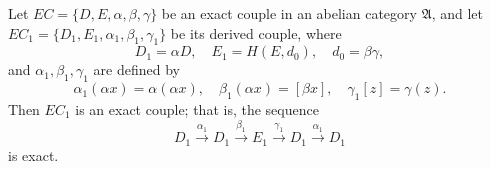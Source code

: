 Let $\mathit{EC} = \{D, E, \alpha, \beta, \gamma\}$ be an exact couple in an abelian category $\mathfrak{A}$, and let $\mathit{EC}_1 = \{D_1, E_1, \alpha_1, \beta_1, \gamma_1\}$ be its derived couple, where
$$D_1 = \alpha D, \quad E_1 = H(E, d_0), \quad d_0 = \beta\gamma,$$
and $\alpha_1, \beta_1, \gamma_1$ are defined by
$$\alpha_1(\alpha x) = \alpha(\alpha x), \quad \beta_1(\alpha x) = [\beta x], \quad \gamma_1[z] = \gamma(z).$$
Then $\mathit{EC}_1$ is an exact couple; that is, the sequence
$$D_1 \xrightarrow{\alpha_1} D_1 \xrightarrow{\beta_1} E_1 \xrightarrow{\gamma_1} D_1 \xrightarrow{\alpha_1} D_1$$
is exact.
